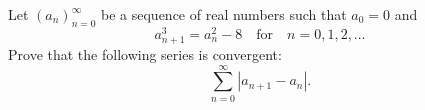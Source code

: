 \documentclass{article}
\begin{document}
\setlength{\parindent}{0pt}
Let \(\displaystyle (a_n)_{n=0}^\infty\) be a sequence of real numbers such that \(\displaystyle a_0=0\) and$$a_{n+1}^3=a_n^2-8 \quad \text{for} \quad n=0,1,2,\ldots$$
Prove that the following series is convergent:$$\sum_{n=0}^\infty|a_{n+1}-a_n|.$$
\end{document}
